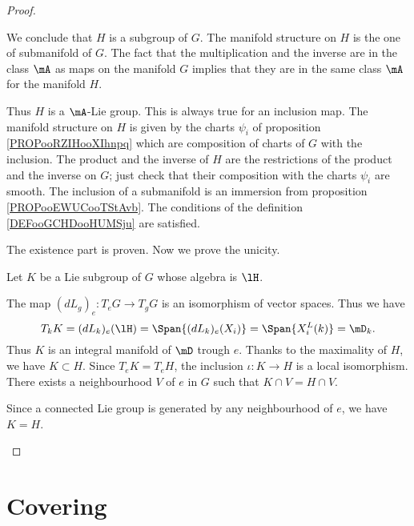 \begin{proof}
\begin{subproof}
        We conclude that \( H\) is a subgroup of \( G\).
        The manifold structure on \( H\) is the one of submanifold of \( G\). The fact that the multiplication and the inverse are in the class \( \mA\) as maps on the manifold \( G\) implies that they are in the same class \( \mA\) for the manifold \( H\).

        Thus \( H\) is a \( \mA\)-Lie group.
        This is always true for an inclusion map.
        The manifold structure on \( H\) is given by the charts \( \psi_i\) of proposition \ref{PROPooRZIHooXIhnpq} which are composition of charts of \( G\) with the inclusion. The product and the inverse of \( H\) are the restrictions of the product and the inverse on \( G\); just check that their composition with the charts \( \psi_i\) are smooth.
        The inclusion of a submanifold is an immersion from proposition \ref{PROPooEWUCooTStAvb}.
        The conditions of the definition \ref{DEFooGCHDooHUMSju} are satisfied.
    \end{subproof}
    The existence part is proven. Now we prove the unicity.

    Let \( K\) be a Lie subgroup of \( G\) whose algebra is \( \lH\).
    \begin{subproof}
    \spitem[\( T_kK=\mD_k\)]
        The map \( (dL_g)_e\colon T_eG\to T_gG\) is an isomorphism of vector spaces. Thus we have
        \begin{equation}
            T_kK=(dL_k)_e(\lH)=\Span\{ (dL_k)_e(X_i) \}=\Span\{ X_i^L(k) \}=\mD_k.
        \end{equation}
    \spitem[Maximality]
        Thus \( K\) is an integral manifold of \( \mD\) trough \( e\). Thanks to the maximality of \( H\), we have \( K\subset H\). Since \( T_eK=T_eH\), the inclusion \( \iota\colon K\to H\) is a local isomorphism. There exists a neighbourhood \( V\) of \( e\) in \( G\) such that \( K\cap V=H\cap V\).
         
        Since a connected Lie group is generated by any neighbourhood of \( e\), we have \( K=H\).
    \end{subproof}
\end{proof}


\section{Covering}

